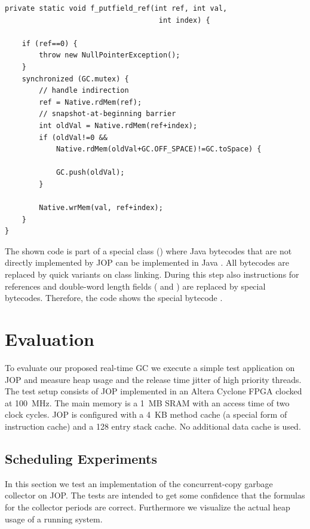 {\small
\begin{verbatim}
private static void f_putfield_ref(int ref, int val,
                                    int index) {

    if (ref==0) {
        throw new NullPointerException();
    }
    synchronized (GC.mutex) {
        // handle indirection
        ref = Native.rdMem(ref);
        // snapshot-at-beginning barrier
        int oldVal = Native.rdMem(ref+index);
        if (oldVal!=0 &&
            Native.rdMem(oldVal+GC.OFF_SPACE)!=GC.toSpace) {

            GC.push(oldVal);
        }

        Native.wrMem(val, ref+index);
    }
}
\end{verbatim}
}

The shown code is part of a special class ()
where Java bytecodes that are not directly implemented by JOP can be
implemented in Java \cite{jop:thesis}. All  bytecodes are
replaced by quick variants on class linking. During this step also
 instructions for references and double-word length fields
( and ) are replaced by special
bytecodes. Therefore, the code shows the special bytecode
.



\section{Evaluation}

To evaluate our proposed real-time GC we execute a simple test
application on JOP and measure heap usage and the release time
jitter of high priority threads. The test setup consists of JOP
implemented in an Altera Cyclone FPGA clocked at 100~MHz. The main
memory is a 1~MB SRAM with an access time of two clock cycles. JOP
is configured with a 4~KB method cache (a special form of
instruction cache) and a 128 entry stack cache. No additional data
cache is used.

\subsection{Scheduling Experiments}

In this section we test an implementation of the concurrent-copy
garbage collector on JOP. The tests are intended to get some
confidence that the formulas for the collector periods are correct.
Furthermore we visualize the actual heap usage of a running system.

